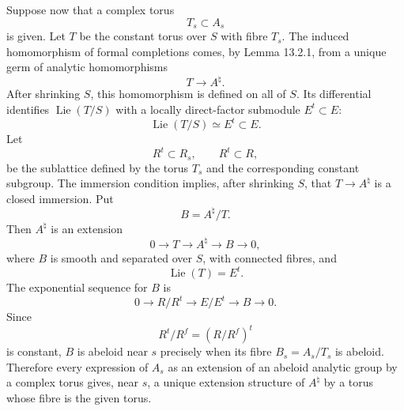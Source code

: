 \documentclass[11pt]{article}
\providecommand{\Lie}{\operatorname{Lie}}
\begin{document}
Suppose now that a complex torus
\begin{equation}\tag{13.3.7}
        T_s\subset A_s
\end{equation}
is given.  Let \(T\) be the constant torus over \(S\) with fibre \(T_s\).  The induced homomorphism of formal completions comes, by Lemma 13.2.1, from a unique germ of analytic homomorphisms
\begin{equation}\tag{13.3.9}
        T\longrightarrow A^\natural.
\end{equation}
After shrinking \(S\), this homomorphism is defined on all of \(S\).  Its differential identifies \(\Lie(T/S)\) with a locally direct-factor submodule \(E^t\subset E\):
\begin{equation}\tag{13.3.10}
        \Lie(T/S)\simeq E^t\subset E.
\end{equation}
Let
\begin{equation}\tag{13.3.11}
        R^t\subset R_s,
        \qquad R^t\subset R,
\end{equation}
be the sublattice defined by the torus \(T_s\) and the corresponding constant subgroup.  The immersion condition implies, after shrinking \(S\), that \(T\to A^\natural\) is a closed immersion.  Put
\begin{equation}\tag{13.3.12}
        B=A^\natural/T.
\end{equation}
Then \(A^\natural\) is an extension
\begin{equation}\tag{13.3.13}
        0\longrightarrow T\longrightarrow A^\natural\longrightarrow B\longrightarrow 0,
\end{equation}
where \(B\) is smooth and separated over \(S\), with connected fibres, and
\begin{equation}\tag{13.3.14}
        \Lie(T)=E^t.
\end{equation}
The exponential sequence for \(B\) is
\begin{equation}\tag{13.3.15}
        0\longrightarrow R/R^t\longrightarrow E/E^t\longrightarrow B\longrightarrow 0.
\end{equation}
Since
\begin{equation}\tag{13.3.16}
        R^t/R^f=(R/R^f)^t
\end{equation}
is constant, \(B\) is abeloid near \(s\) precisely when its fibre \(B_s=A_s/T_s\) is abeloid.  Therefore every expression of \(A_s\) as an extension of an abeloid analytic group by a complex torus gives, near \(s\), a unique extension structure of \(A^\natural\) by a torus whose fibre is the given torus.
\end{document}
